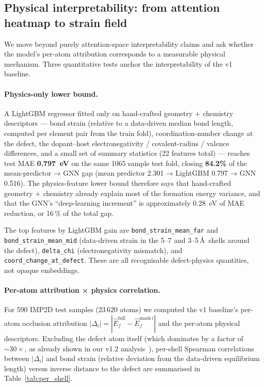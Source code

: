 \documentclass[11pt,a4paper]{article}
\begin{document}
\subsection{Physical interpretability: from attention heatmap to strain field}\label{sec:interp}

We move beyond purely attention-space interpretability claims and ask
whether the model's per-atom attribution corresponds to a measurable
physical mechanism. Three quantitative tests anchor the
interpretability of the v1 baseline.

\paragraph{Physics-only lower bound.}
A LightGBM regressor fitted only on hand-crafted geometry +
chemistry descriptors --- bond strain (relative to a data-driven
median bond length, computed per element pair from the train fold),
coordination-number change at the defect, the dopant--host
electronegativity / covalent-radius / valence differences, and a
small set of summary statistics (22 features total) --- reaches test
MAE \textbf{0.797~eV} on the same 1065 sample test fold, closing
\textbf{84.2\%} of the mean-predictor → GNN gap (mean predictor
2.301 → LightGBM 0.797 → GNN 0.516). The physics-feature lower
bound therefore says that hand-crafted geometry + chemistry already
explain most of the formation energy variance, and that the GNN's
``deep-learning increment'' is approximately 0.28~eV of MAE
reduction, or 16\,\% of the total gap.

The top features by LightGBM gain are
\texttt{bond\_strain\_mean\_far} and
\texttt{bond\_strain\_mean\_mid} (data-driven strain in the 5--7 and
3--5\,\AA\ shells around the defect), \texttt{delta\_chi}
(electronegativity mismatch), and \texttt{coord\_change\_at\_defect}.
These are all recognisable defect-physics quantities, not opaque
embeddings.

\paragraph{Per-atom attribution × physics correlation.}
For 590 IMP2D test samples (23\,620 atoms) we computed the v1
baseline's per-atom occlusion attribution
$|\Delta_i| = |\hat{E}_f^{\mathrm{full}} - \hat{E}_f^{\mathrm{mask}\,i}|$
and the per-atom physical descriptors. Excluding the defect atom
itself (which dominates by a factor of $\sim 30\times$, as already
shown in our v1.2 analysis~\cite{ourPaperV12}), per-shell Spearman
correlations between $|\Delta_i|$ and bond strain (relative
deviation from the data-driven equilibrium length) versus inverse
distance to the defect are summarised in
Table~\ref{tab:per_shell}.
\end{document}
